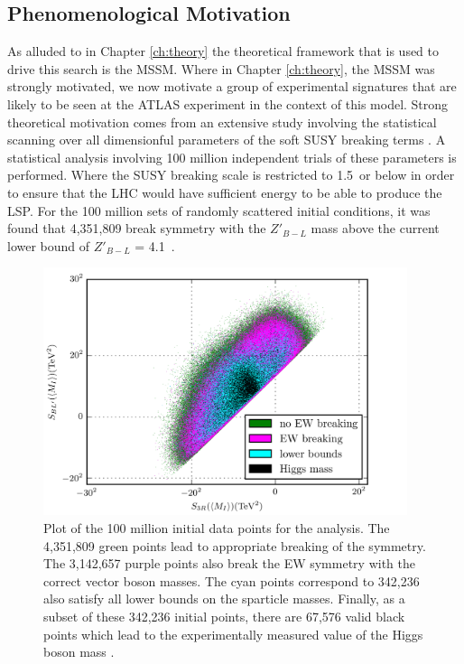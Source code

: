 \subsection{Phenomenological Motivation}
As alluded to in Chapter \ref{ch:theory} the theoretical framework that is used to drive this search is the \BL MSSM. 
Where in Chapter \ref{ch:theory}, the \BL MSSM was strongly motivated, we now motivate a group of experimental signatures that are likely to be seen at the ATLAS experiment in the context of this model.
Strong theoretical motivation comes from an extensive study involving the statistical scanning over all dimensionful parameters of the soft SUSY breaking terms \cite{Dumitru:2018jyb}.
A statistical analysis involving 100 million independent trials of these parameters is performed.
Where the SUSY breaking scale is restricted to 1.5~\tev or below in order to ensure that the LHC would have sufficient energy to be able to produce the LSP.
For the 100 million sets of randomly scattered initial conditions, it was found that 4,351,809 break \BL symmetry with the $Z'_{B-L}$ mass above the current lower bound of $Z'_{B-L}$ = 4.1~\tev.
\begin{figure}
    \centering
    \includegraphics[width=0.95\textwidth]{figs/rpvthreel/statthrows.png}
    \caption[Plot of initial 100 million statistical trials of SUSY parameters and the subsequent filtering out of said points that do not satisfy necessary physical bounds.]{Plot of the 100 million initial data points for the analysis.
    The 4,351,809 green points lead to appropriate breaking of the \BL symmetry.
    The 3,142,657 purple points also break the EW symmetry with the correct vector boson masses.
    The cyan points correspond to 342,236 also satisfy all lower bounds on the sparticle masses.
    Finally, as a subset of these 342,236 initial points, there are 67,576 valid black points which lead to the experimentally measured value of the Higgs boson mass \cite{Dumitru:2018jyb}.}
    \label{fig:statthrows}
\end{figure}
